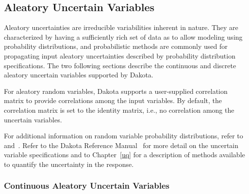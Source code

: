 \subsection{Aleatory Uncertain Variables}\label{variables:uncertain:auv}

Aleatory uncertainties are irreducible variabilities inherent in
nature.  They are characterized by having a sufficiently rich set of
data as to allow modeling using probability distributions, and
probabilistic methods are commonly used for propagating input aleatory
uncertainties described by probability distribution specifications.
The two following sections describe the continuous and discrete
aleatory uncertain variables supported by Dakota.

For aleatory random variables, Dakota supports a user-supplied
correlation matrix to provide correlations among the input
variables. By default, the correlation matrix is set to the identity
matrix, i.e., no correlation among the uncertain variables.

For additional information on random variable probability
distributions, refer to~\cite{Hal00} and~\cite{Swi04}. Refer to the Dakota
Reference Manual~\cite{RefMan} for more detail on the uncertain variable
specifications and to Chapter~\ref{uq} for a description of methods
available to quantify the uncertainty in the response.

\subsubsection{Continuous Aleatory Uncertain Variables}\label{variables:uncertain:cauv}


